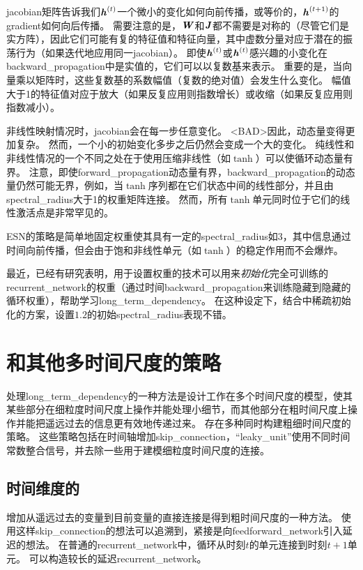 \gls{jacobian}矩阵告诉我们$\boldsymbol{\mathit{h}}^{(t)}$一个微小的变化如何向前传播，或等价的，$\boldsymbol{\mathit{h}}^{(t+1)}$的\gls{gradient}如何向后传播。
需要注意的是，$\boldsymbol{\mathit{W}}$和$\boldsymbol{\mathit{J}}$都不需要是对称的（尽管它们是实方阵），因此它们可能有复的特征值和特征向量，其中虚数分量对应于潜在的振荡行为（如果迭代地应用同一\gls{jacobian}）。
即使$\boldsymbol{\mathit{h}}^{(t)}$或$\boldsymbol{\mathit{h}}^{(t)}$感兴趣的小变化在\gls{backward_propagation}中是实值的，它们可以以复数基来表示。
重要的是，当向量乘以矩阵时，这些复数基的系数幅值（复数的绝对值）会发生什么变化。
幅值大于1的特征值对应于放大（如果反复应用则指数增长）或收缩（如果反复应用则指数减小）。

非线性映射情况时，\gls{jacobian}会在每一步任意变化。
<BAD>因此，动态量变得更加复杂。
然而，一个小的初始变化多步之后仍然会变成一个大的变化。
纯线性和非线性情况的一个不同之处在于使用压缩非线性（如$\tanh$）可以使循环动态量有界。
注意，即使\gls{forward_propagation}动态量有界，\gls{backward_propagation}的动态量仍然可能无界，例如，当$\tanh$序列都在它们状态中间的线性部分，并且由\gls{spectral_radius}大于1的权重矩阵连接。
然而，所有$\tanh$单元同时位于它们的线性激活点是非常罕见的。


\gls{ESN}的策略是简单地固定权重使其具有一定的\gls{spectral_radius}如3，其中信息通过时间向前传播，但会由于饱和非线性单元（如$\tanh$）的稳定作用而不会爆炸。

最近，已经有研究表明，用于设置权重的技术可以用来\emph{初始化}完全可训练的\gls{recurrent_network}的权重（通过时间\gls{backward_propagation}来训练隐藏到隐藏的循环权重），帮助学习\gls{long_term_dependency}\citep{Sutskever-thesis2012,sutskeverimportance}。
在这种设定下，结合中稀疏初始化的方案，设置$1.2$的初始\gls{spectral_radius}表现不错。

\section{和其他多时间尺度的策略}
\label{sec:leaky_units_and_other_strategiesfor_multiple_time_scales}
处理\gls{long_term_dependency}的一种方法是设计工作在多个时间尺度的模型，使其某些部分在细粒度时间尺度上操作并能处理小细节，而其他部分在粗时间尺度上操作并能把遥远过去的信息更有效地传递过来。
存在多种同时构建粗细时间尺度的策略。
这些策略包括在时间轴增加\gls{skip_connection}，``\gls{leaky_unit}''使用不同时间常数整合信号，并去除一些用于建模细粒度时间尺度的连接。

\subsection{时间维度的}
\label{sec:adding_skip_connections_through_time}
增加从遥远过去的变量到目前变量的直接连接是得到粗时间尺度的一种方法。
使用这样\gls{skip_connection}的想法可以追溯到\cite{Lin-ieeetnn96}，紧接是向\gls{feedforward_network}引入延迟的想法\citep{Lang+Hinton88}。
在普通的\gls{recurrent_network}中，循环从时刻$t$的单元连接到时刻$t+1$单元。
可以构造较长的延迟\gls{recurrent_network}\citep{Bengio91z}。

